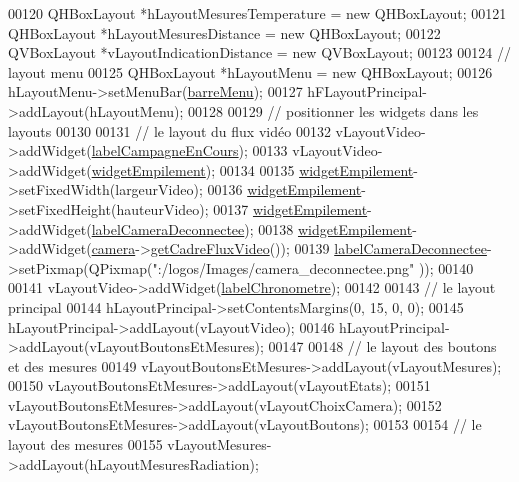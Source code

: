 \begin{DoxyCode}
00120     QHBoxLayout *hLayoutMesuresTemperature = \textcolor{keyword}{new} QHBoxLayout;
00121     QHBoxLayout *hLayoutMesuresDistance = \textcolor{keyword}{new} QHBoxLayout;
00122     QVBoxLayout *vLayoutIndicationDistance = \textcolor{keyword}{new} QVBoxLayout;
00123 
00124     \textcolor{comment}{// layout menu}
00125     QHBoxLayout *hLayoutMenu = \textcolor{keyword}{new} QHBoxLayout;
00126     hLayoutMenu->setMenuBar(\hyperlink{class_i_h_m_rov_a169e28bc630468d13c05de321f66ca3c}{barreMenu});
00127     hFLayoutPrincipal->addLayout(hLayoutMenu);
00128 
00129     \textcolor{comment}{// positionner les widgets dans les layouts}
00130 
00131     \textcolor{comment}{// le layout du flux vidéo}
00132     vLayoutVideo->addWidget(\hyperlink{class_i_h_m_rov_a14aa781bc1a446ba6b3ecdea029caa91}{labelCampagneEnCours});
00133     vLayoutVideo->addWidget(\hyperlink{class_i_h_m_rov_a238e50788d62ae2c34b4ae6c8082d596}{widgetEmpilement});
00134 
00135     \hyperlink{class_i_h_m_rov_a238e50788d62ae2c34b4ae6c8082d596}{widgetEmpilement}->setFixedWidth(largeurVideo);
00136     \hyperlink{class_i_h_m_rov_a238e50788d62ae2c34b4ae6c8082d596}{widgetEmpilement}->setFixedHeight(hauteurVideo);
00137     \hyperlink{class_i_h_m_rov_a238e50788d62ae2c34b4ae6c8082d596}{widgetEmpilement}->addWidget(\hyperlink{class_i_h_m_rov_ac3b86335f9903c2a71eafe941d5c302b}{labelCameraDeconnectee});
00138     \hyperlink{class_i_h_m_rov_a238e50788d62ae2c34b4ae6c8082d596}{widgetEmpilement}->addWidget(\hyperlink{class_i_h_m_rov_a0eda0e4726269508d4563d98064dca9d}{camera}->\hyperlink{class_camera_a67420d3ef14065a412327ada6193a2e0}{getCadreFluxVideo}());
00139     \hyperlink{class_i_h_m_rov_ac3b86335f9903c2a71eafe941d5c302b}{labelCameraDeconnectee}->setPixmap(QPixmap(\textcolor{stringliteral}{":/logos/Images/camera\_deconnectee.png"}
      ));
00140 
00141     vLayoutVideo->addWidget(\hyperlink{class_i_h_m_rov_a32e5cb80ecae7bad6914c690ebd93995}{labelChronometre});
00142 
00143     \textcolor{comment}{// le layout principal}
00144     hLayoutPrincipal->setContentsMargins(0, 15, 0, 0);
00145     hLayoutPrincipal->addLayout(vLayoutVideo);
00146     hLayoutPrincipal->addLayout(vLayoutBoutonsEtMesures);
00147 
00148     \textcolor{comment}{// le layout des boutons et des mesures}
00149     vLayoutBoutonsEtMesures->addLayout(vLayoutMesures);
00150     vLayoutBoutonsEtMesures->addLayout(vLayoutEtats);
00151     vLayoutBoutonsEtMesures->addLayout(vLayoutChoixCamera);
00152     vLayoutBoutonsEtMesures->addLayout(vLayoutBoutons);
00153 
00154     \textcolor{comment}{// le layout des mesures}
00155     vLayoutMesures->addLayout(hLayoutMesuresRadiation);

\end{DoxyCode}
